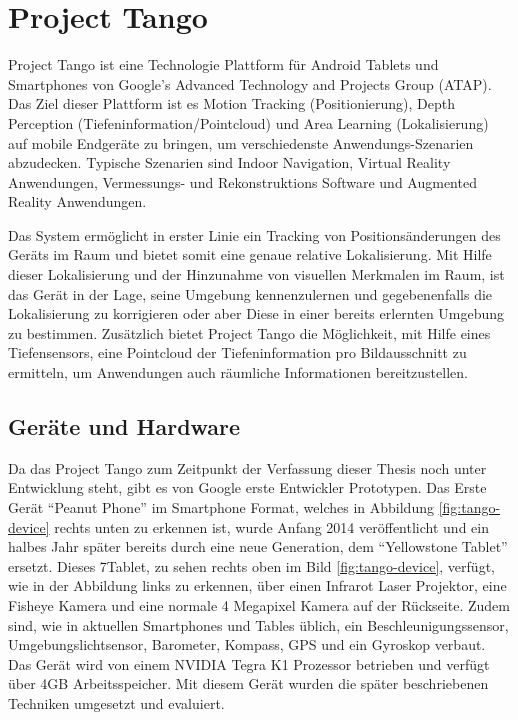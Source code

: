 
\section{Project Tango} \label{sec:theory_project_tango}

Project Tango ist eine Technologie Plattform für Android Tablets und Smartphones von Google’s Advanced Technology and Projects Group (ATAP). Das Ziel dieser Plattform ist es Motion Tracking (Positionierung), Depth Perception (Tiefeninformation/Pointcloud) und Area Learning (Lokalisierung) auf mobile Endgeräte zu bringen, um verschiedenste Anwendungs-Szenarien abzudecken. Typische Szenarien sind Indoor Navigation, Virtual Reality Anwendungen, Vermessungs- und Rekonstruktions Software und Augmented Reality Anwendungen.

Das System ermöglicht in erster Linie ein Tracking von Positionsänderungen des Geräts im Raum und bietet somit eine genaue relative Lokalisierung. Mit Hilfe dieser Lokalisierung und der Hinzunahme von visuellen Merkmalen im Raum, ist das Gerät in der Lage, seine Umgebung kennenzulernen und gegebenenfalls die Lokalisierung zu korrigieren oder aber Diese in einer bereits erlernten Umgebung zu bestimmen. Zusätzlich bietet Project Tango die Möglichkeit, mit Hilfe eines Tiefensensors, eine Pointcloud der Tiefeninformation pro Bildausschnitt zu ermitteln, um Anwendungen auch räumliche Informationen bereitzustellen.  \citep{Proje19:online} 

\subsection{Geräte und Hardware}

Da das Project Tango zum Zeitpunkt der Verfassung dieser Thesis noch unter Entwicklung steht, gibt es von Google erste Entwickler Prototypen. Das Erste Gerät \enquote{Peanut Phone} im Smartphone Format, welches in Abbildung \ref{fig:tango-device} rechts unten zu erkennen ist, wurde Anfang 2014 veröffentlicht und ein halbes Jahr später bereits durch eine neue Generation, dem \enquote{Yellowstone Tablet} ersetzt. Dieses 7\dq Tablet, zu sehen rechts oben im Bild \ref{fig:tango-device}, verfügt, wie in der Abbildung links zu erkennen, über einen Infrarot Laser Projektor, eine Fisheye Kamera und eine normale 4 Megapixel Kamera auf der Rückseite. Zudem sind, wie in aktuellen Smartphones und Tables üblich, ein Beschleunigungssensor, Umgebungslichtsensor, Barometer, Kompass, GPS und ein Gyroskop verbaut. Das Gerät wird von einem NVIDIA Tegra K1 Prozessor betrieben und verfügt über 4GB Arbeitsspeicher. \citep{Proje19:online} Mit diesem Gerät wurden die später beschriebenen Techniken umgesetzt und evaluiert. 

